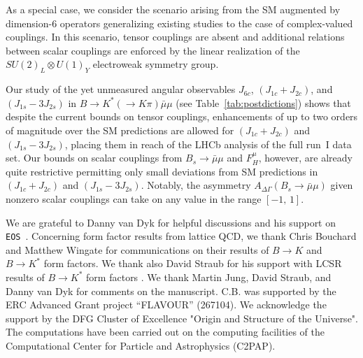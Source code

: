 \documentclass[twocolumn,epjc3]{svjour3}
\numberwithin{equation}{section}
\def \reftab#1{Table~\ref{#1}}
\newcommand{\christoph}[1]{{\color{red}{#1}}}
\renewcommand{\[}{\big[}
\renewcommand{\]}{\big]}
\renewcommand{\(}{\big(}
\renewcommand{\)}{\big)}
\def \eos{\texttt{EOS}}
\begin{document}
As a special case, we consider the scenario arising from the SM
augmented by dimension-6 operators generalizing existing studies to
the case of complex-valued couplings. In this scenario, tensor
couplings are absent and additional relations between scalar couplings
are enforced by the linear realization of the $SU(2)_L \otimes U(1)_Y$
electroweak symmetry group.

Our study of the {yet unmeasured} angular observables $J_{6c}$,
$(J_{1c} + J_{2c})$, and $(J_{1s} - 3 J_{2s})$ in $B\to K^* (\to K\pi)
\bar\mu\mu$ (see \reftab{tab:postdictions}) shows that despite the
current bounds on tensor couplings, enhancements of up to two orders
of magnitude over the SM predictions are allowed for $(J_{1c} +
J_{2c})$ and $(J_{1s} - 3 J_{2s})$, placing them in reach of the LHCb
analysis of the full run~I data set. Our bounds on scalar couplings
from $B_s\to \bar\mu\mu$ and $F_H^\mu$, however, are already quite
restrictive permitting only small deviations from SM predictions in
$(J_{1c} + J_{2c})$ and $(J_{1s} - 3 J_{2s})$. Notably, the \christoph{
mass-eigenstate rate}
asymmetry $A_{\Delta\Gamma}(B_s\to \bar\mu\mu)$ given nonzero scalar
couplings can take on any value in the range $[-1,\, 1]$.

%
%
%
\begin{acknowledgements}
  We are grateful to Danny van Dyk for helpful discussions and his support on
  \eos~\cite{EOS}. Concerning form factor results from lattice QCD, we thank
  Chris Bouchard and Matthew Wingate for communications on their results of
  $B\to K$ \cite{Bouchard:2013eph} and $B\to K^*$ \cite{Horgan:2015vla} form
  factors. We thank also David Straub for his support with LCSR results of $B\to
  K^*$ form factors \cite{Straub:2015ica}. We thank Martin Jung, David Straub,
  and Danny van Dyk for comments on the manuscript. C.B. was supported by the ERC
  Advanced Grant project ``FLAVOUR'' (267104). We acknowledge the support by the
  DFG Cluster of Excellence "Origin and Structure of the Universe". The
  computations have been carried out on the computing facilities of the
  Computational Center for Particle and Astrophysics (C2PAP).
\end{acknowledgements}


%
%

\appendix
\end{document}
